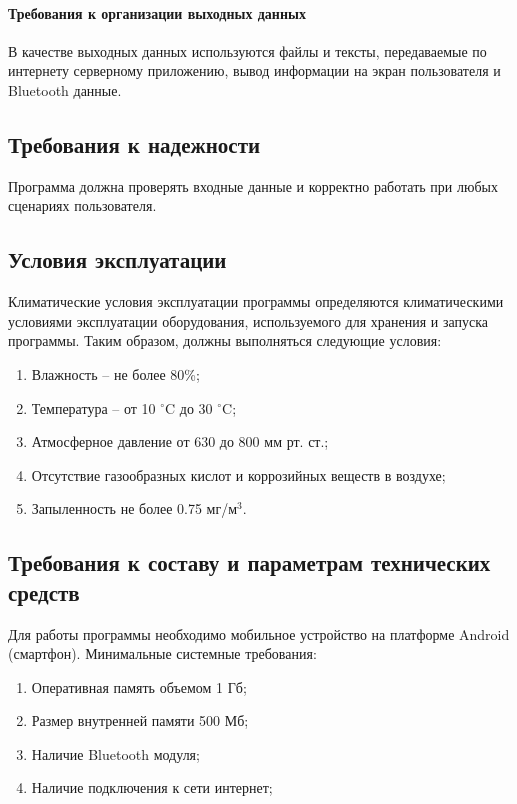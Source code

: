 \documentclass[testmethods]{espd}
\begin{document}
\paragraph{Требования к организации выходных данных}
В качестве выходных данных используются файлы и тексты, передаваемые по интернету серверному приложению, вывод информации на экран пользователя и Bluetooth данные.

\subsection{Требования к надежности}
Программа должна проверять входные данные и корректно работать при любых сценариях пользователя.
\subsection{Условия эксплуатации}
Климатические условия эксплуатации программы определяются климатическими условиями эксплуатации оборудования, используемого для хранения и запуска программы. Таким образом, должны выполняться следующие условия:

\begin{enumerate}
\item Влажность -- не более 80\%;
\item Температура -- от 10 $^\circ$C до 30 $^\circ$C;
\item Атмосферное давление от 630 до 800 мм рт. ст.;
\item Отсутствие газообразных кислот и коррозийных веществ в воздухе;
\item Запыленность не более 0.75 мг/м$^3$.
\end{enumerate}

\subsection{Требования к составу и параметрам технических средств}\label{subsection:requirements}
Для работы программы необходимо мобильное устройство на платформе Android (смартфон). Минимальные системные требования:

\begin{enumerate}
\item Оперативная память объемом 1 Гб;
\item Размер внутренней памяти 500 Мб;
\item Наличие Bluetooth модуля;
\item Наличие подключения к сети интернет;
\end{enumerate}
\end{document}
